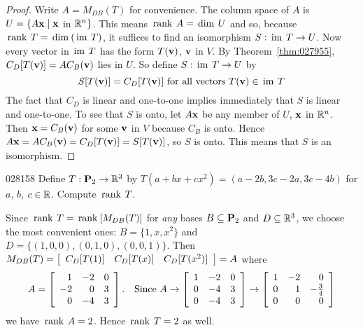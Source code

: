 \begin{proof}
Write $A = M_{DB}(T)$ for convenience. The column space of $A$ is $U = \{A\textbf{x} \mid \textbf{x}$ in $\mathbb{R}^n\}$. This means $\thinspace\operatorname{rank \medspace}A = \thinspace\operatorname{dim \medspace}U$ and so, because $\thinspace\operatorname{rank \medspace}T = \thinspace\operatorname{dim\medspace}(\thinspace\operatorname{im \medspace}T)$, it suffices to find an isomorphism $S : \thinspace\operatorname{im \medspace}T \to U$. Now every vector in $\thinspace\operatorname{im \medspace}T$ has the form $T(\textbf{v})$, $\textbf{v}$ in $V$. By Theorem~\ref{thm:027955}, $C_{D}[T(\textbf{v})] = AC_{B}(\textbf{v})$ lies in $U$. So define $S : \thinspace\operatorname{im \medspace}T \to U$ by
\begin{equation*}
S[T(\textbf{v})] = C_D[T(\textbf{v})] \mbox{ for all vectors } T(\textbf{v}) \in \thinspace\operatorname{im \medspace} T
\end{equation*}
The fact that $C_{D}$ is linear and one-to-one implies immediately that $S$ is linear and one-to-one. To see that $S$ is onto, let $A\textbf{x}$ be any member of $U$, $\textbf{x}$ in $\mathbb{R}^n$. Then $\textbf{x} = C_{B}(\textbf{v})$ for some $\textbf{v}$ in $V$ because $C_{B}$ is onto. Hence $A\textbf{x} = AC_{B}(\textbf{v}) = C_{D}[T(\textbf{v})] = S[T(\textbf{v})]$, so $S$ is onto. This means that $S$ is an isomorphism.
\end{proof}

\begin{example}{}{028158}
Define $T : \textbf{P}_{2} \to \mathbb{R}^3$ by $T(a + bx + cx^{2}) = (a - 2b, 3c - 2a, 3c - 4b)$ for $a$, $b$, $c \in \mathbb{R}$. Compute $\thinspace\operatorname{rank \medspace}T$.


\begin{solution}
  Since $\thinspace\operatorname{rank \medspace}T = \thinspace\operatorname{rank \medspace}[M_{DB}(T)]$ for \textit{any} bases $B \subseteq \textbf{P}_{2}$ and $D \subseteq \mathbb{R}^3$, we choose the most convenient ones: $B = \{1, x, x^{2}\}$ and $D = \{(1, 0, 0), (0, 1, 0), (0, 0, 1)\}$. Then $M_{DB}(T) = \left[ \begin{array}{ccc} C_{D}[T(1)] & C_{D}[T(x)] & C_{D}[T(x^{2})] \end{array} \right] = A$ where
\begin{equation*}
A = \left[ \begin{array}{rrr} 1 & -2 & 0 \\ -2 & 0 & 3 \\ 0 & -4 & 3 \end{array} \right]. \quad \mbox{Since } A \to \left[ \begin{array}{rrr} 1 & -2 & 0 \\ 0 & -4 & 3 \\ 0 & -4 & 3 \end{array} \right] \to \left[ \begin{array}{rrr} 1 & -2 & 0 \\ 0 & 1 & -\tfrac{3}{4} \\ 0 & 0 & 0 \end{array} \right]
\end{equation*}
we have $\thinspace\operatorname{rank \medspace}A = 2$. Hence $\thinspace\operatorname{rank \medspace}T = 2$ as well.
\end{solution}
\end{example}

